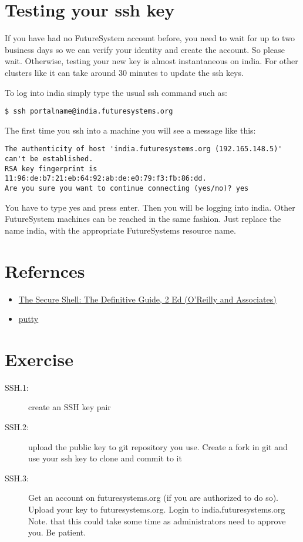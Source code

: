 \section{Testing your ssh key}\label{testing-your-ssh-key}

If you have had no FutureSystem account before, you need to wait for up
to two business days so we can verify your identity and create the
account. So please wait. Otherwise, testing your new key is almost
instantaneous on india. For other clusters like it can take around 30
minutes to update the ssh keys.

To log into india simply type the usual ssh command such as:

\begin{verbatim}
$ ssh portalname@india.futuresystems.org
\end{verbatim}

The first time you ssh into a machine you will see a message like this:

\begin{verbatim}
The authenticity of host 'india.futuresystems.org (192.165.148.5)' can't be established.
RSA key fingerprint is 11:96:de:b7:21:eb:64:92:ab:de:e0:79:f3:fb:86:dd.
Are you sure you want to continue connecting (yes/no)? yes 
\end{verbatim}

You have to type yes and press enter. Then you will be logging into
india. Other FutureSystem machines can be reached in the same fashion.
Just replace the name india, with the appropriate FutureSystems resource
name.

\section{Refernces}

\begin{itemize}
\item \href{http://shop.oreilly.com/product/9780596008956.do}{The
    Secure Shell: The Definitive Guide, 2 Ed (O'Reilly and
    Associates)}
\item \href{https://www.chiark.greenend.org.uk/~sgtatham/putty/}{putty}
\end{itemize}

\section{Exercise}


\begin{description}
\item[SSH.1:] create an SSH key pair
\item[SSH.2:] upload the public key to git repository you use. Create a fork in
  git and use your ssh key to clone and commit to it
\item[SSH.3:] Get an account on futuresystems.org (if you are
  authorized to do so).  Upload your key to futuresystems.org. Login
  to india.futuresystems.org Note. that this could take some time as
  administrators need to approve you. Be patient.
\end{description}

